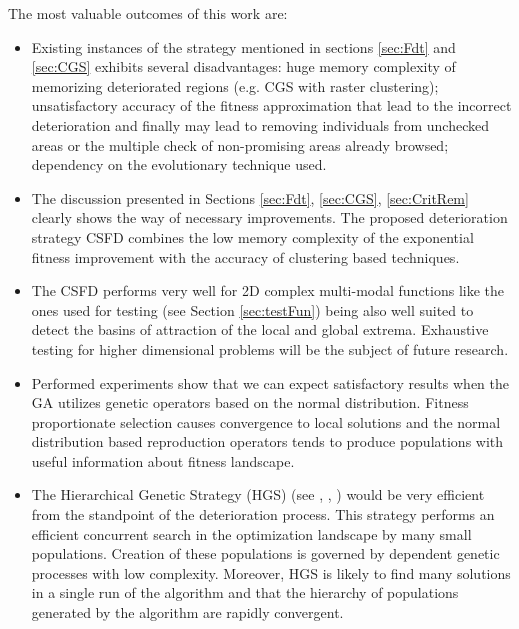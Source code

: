 The most valuable outcomes of this work are:
\begin{itemize}

\item Existing instances of the strategy mentioned in sections \ref{sec:Fdt} and
\ref{sec:CGS} exhibits several disadvantages: 
huge memory complexity of memorizing deteriorated regions
(e.g. CGS with raster clustering); 
unsatisfactory accuracy of the fitness approximation 
that lead to the incorrect deterioration and finally may lead to removing
individuals from unchecked areas or the multiple check of non-promising areas
already browsed; 
dependency on the evolutionary technique used.

\item
The discussion presented in Sections \ref{sec:Fdt}, \ref{sec:CGS}, \ref{sec:CritRem}
clearly shows the way of necessary improvements.
The proposed deterioration strategy CSFD combines the low memory complexity
of the exponential fitness improvement with the accuracy of
clustering based techniques.

\item
The CSFD performs very well for 2D complex multi-modal functions like the ones
used for testing (see Section \ref{sec:testFun}) being also well suited to detect
the basins of attraction of the local and global extrema.
Exhaustive testing for higher dimensional problems will be the subject
of future research.

\item
Performed experiments show that we can expect satisfactory results 
when the GA utilizes
genetic operators based on the normal distribution. 
Fitness proportionate selection causes convergence to local solutions 
and the normal distribution based reproduction operators tends 
to produce populations with useful information about fitness landscape.

\item
The Hierarchical Genetic Strategy (HGS)
(see \cite{SchaeferKolodziej2003},
\cite{SchaeferAdamskaTelega2004},
\cite{WierzbaSemczukKolodziejSchaefer2003})
would be very efficient 
from the standpoint of the deterioration process.
This strategy performs an efficient concurrent
search in the optimization landscape by many small populations. Creation of
these populations is governed by dependent genetic processes with low complexity.
Moreover, HGS is likely to find many solutions in a
single run of the algorithm and that the hierarchy of populations generated
by the algorithm are rapidly convergent. 



\end{itemize}
